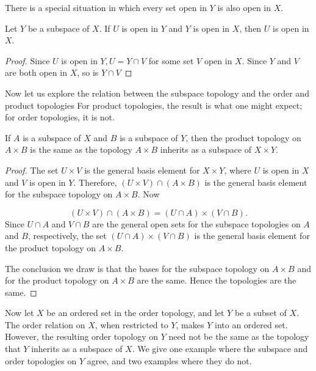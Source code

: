 There is a special situation in which every set open in \(Y\) is also open in \(X\).

\begin{lemma}
\label{lem:\thetheorem}
 Let \(Y\) be a subspace of \(X\). If \(U\) is open in \(Y\) and \(Y\) is open in \(X\), then \(U\) is open in \(X\).
\end{lemma}

\begin{proof}
 Since \(U\) is open in \(Y,U = Y \cap V\) for some set \(V\) open in \(X\). Since \(Y\) and \(V\) are both open in \(X\), so is \(Y \cap V\)
\end{proof}

Now let us explore the relation between the subspace topology and the order and product topologies For product topologies, the result is what one might expect; for order topologies, it is not.

\begin{theorem}
\label{thm:\thetheorem}
 If \(A\) is a subspace of \(X\) and \(B\) is a subspace of \(Y\), then the product topology on \(A \times B\) is the same as the topology \(A \times B\) inherits as a subspace of \(X \times Y\).
\end{theorem}

\begin{proof}
 The set \(U \times V\) is the general basis element for \(X \times Y\), where \(U\) is open in \(X\) and \(V\) is open in \(Y\). Therefore, \(( {U \times V}) \cap ( {A \times B})\) is the general basis element for the subspace topology on \(A \times B\). Now

 \[
 ( {U \times V}) \cap ( {A \times B}) = ( {U \cap A}) \times ( {V \cap B}).
 \]
 Since \(U \cap A\) and \(V \cap B\) are the general open sets for the subspace topologies on \(A\) and \(B\), respectively, the set \(( {U \cap A}) \times ( {V \cap B})\) is the general basis element for the product topology on \(A \times B\).

 The conclusion we draw is that the bases for the subspace topology on \(A \times B\) and for the product topology on \(A \times B\) are the same. Hence the topologies are the same.
\end{proof}

Now let \(X\) be an ordered set in the order topology, and let \(Y\) be a subset of \(X\). The order relation on \(X\), when restricted to \(Y\), makes \(Y\) into an ordered set. However, the resulting order topology on \(Y\) need not be the same as the topology that \(Y\) inherits as a subspace of \(X\). We give one example where the subspace and order topologies on \(Y\) agree, and two examples where they do not.

